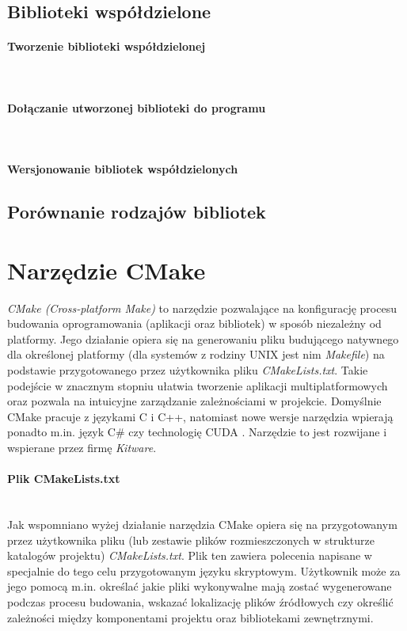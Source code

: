 \subsection{Biblioteki współdzielone}



\paragraph*{Tworzenie biblioteki współdzielonej}\mbox{}\\
\paragraph*{Dołączanie utworzonej biblioteki do programu}\mbox{}\\
\paragraph*{Wersjonowanie bibliotek współdzielonych}

\subsection{Porównanie rodzajów bibliotek}


\section{Narzędzie CMake}

\textit{CMake (Cross-platform Make)} to narzędzie pozwalające na konfigurację procesu budowania oprogramowania (aplikacji oraz bibliotek) w sposób niezależny od platformy. Jego działanie opiera się na generowaniu pliku budującego natywnego dla określonej platformy \cite{CMakeIntro} (dla systemów z rodziny UNIX jest nim \textit{Makefile}) na podstawie przygotowanego przez użytkownika pliku \textit{CMakeLists.txt}. Takie podejście w znacznym stopniu ułatwia tworzenie aplikacji multiplatformowych oraz pozwala na intuicyjne zarządzanie zależnościami w projekcie. Domyślnie CMake pracuje z językami C i C++, natomiast nowe wersje narzędzia wpierają ponadto m.in. język C\# czy technologię CUDA \cite{CMakeSupport}. Narzędzie to jest rozwijane i wspierane przez firmę \textit{Kitware}.\par

\paragraph*{Plik CMakeLists.txt}\mbox{} \\
Jak wspomniano wyżej działanie narzędzia CMake opiera się na przygotowanym przez użytkownika pliku (lub zestawie plików rozmieszczonych w strukturze katalogów projektu) \textit{CMakeLists.txt}. Plik ten zawiera polecenia napisane w specjalnie do tego celu przygotowanym języku skryptowym. Użytkownik może za jego pomocą  m.in. określać jakie pliki wykonywalne mają zostać wygenerowane podczas procesu budowania, wskazać lokalizację plików źródłowych czy określić zależności między komponentami projektu oraz bibliotekami zewnętrznymi. \par

